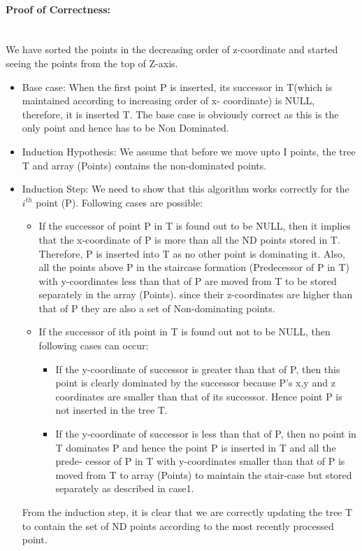 \documentclass[pdftex,a4paper,12pt]{report}
\begin{document}
\paragraph{Proof of Correctness:} \makebox[2pt]{}\\
We have sorted the points in the decreasing order of z-coordinate and started seeing the points from the top of Z-axis.\\
\begin{itemize}
 \item 
 Base case: When the first point P is inserted, its successor in T(which is maintained according to increasing order of x- coordinate) is NULL, therefore, it is inserted T. 
The base case is obviously correct as this is the only point and hence has to be Non Dominated.
\item Induction Hypothesis: We assume that before we move upto I points, the tree T and array (Points)
contains the non-dominated points.
 \item Induction Step: We  need to show that this  algorithm works correctly for the $i^{th}$ point (P). Following cases are possible:
 \begin{itemize}
  \item 
  If the successor of point P in T is found out to be NULL, then it implies
that the x-coordinate of P is more than all the ND points stored  in T. Therefore,
P is inserted into T as no other point is dominating it.
Also, all the points above P in the staircase formation (Predecessor of P in T) with y-coordinates less than that of P are moved from T to be stored separately in the array (Points).
since their z-coordinates are higher than that of P they are also a set of Non-dominating points.
 \item If the successor  of ith point in T is found out not to be NULL, then following cases can occur:
 \begin{itemize}
  \item If the y-coordinate of successor is greater than that of P, then this point is clearly dominated by the successor because P’s x,y and z coordinates are smaller than that of its successor.
Hence point P is not inserted in the tree T.
 \item If the y-coordinate of successor is less than that of P, then no point in T dominates P and hence the point P is inserted in T and all the prede-
cessor of P in T with y-coordinates smaller than that of P is moved from T to array (Points)
to maintain the stair-case but stored separately as described in case1.
 \end{itemize}
 
 \end{itemize}
From the induction step, it is clear that we are correctly updating the tree T to contain the set of
ND points according to the most recently processed point.

 \end{itemize}
\newpage
\end{document}
